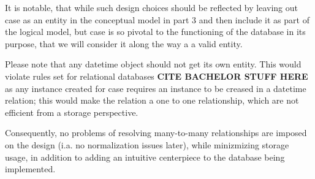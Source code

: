 \documentclass[a4paper]{article}
\begin{document}
 It is notable, that while such design choices should be reflected by leaving out case as an entity in the conceptual model in part 3 and then include it as part of the logical model, but case is so pivotal to the functioning of the database in its purpose, that we will consider it along the way a a valid entity.
 
Please note that any datetime object should not get its own entity. This would violate rules set for relational databases \textbf{CITE BACHELOR STUFF HERE} as any instance created for case requires an instance to be creased in a datetime relation; this would make the relation a one to one relationship, which are not efficient from a storage perspective. 
 
Consequently, no problems of resolving many-to-many relationships are imposed on the design (i.a. no normalization issues later), while minizmizing storage usage, in addition to adding an intuitive centerpiece to the database being implemented.  
 
\end{document}
